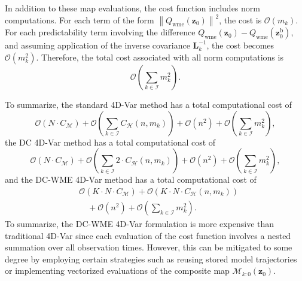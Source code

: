 \documentclass[final,1p,times]{elsarticle}
\begin{document}
In addition to these map evaluations, the cost function includes norm computations. 
For each term of the form $\left\| Q_{\mathrm{wme}}(\mathbf{z}_0) \right\|^2$, the cost is $\mathcal{O}(m_k)$. 
For each predictability term involving the difference $Q_{\mathrm{wme}}(\mathbf{z}_0) - Q_{\mathrm{wme}}(\mathbf{z}_0^{\mathrm{b}})$, and assuming application of the inverse covariance $\mathbf{L}_k^{-1}$, the cost becomes $\mathcal{O}(m_k^2)$. 
Therefore, the total cost associated with all norm computations is
\[
    \mathcal{O}\left( \sum_{k \in \mathcal{I}} m_k^2 \right).
\]

To summarize, the standard 4D-Var method has a total computational cost of
\begin{equation*}
    \mathcal{O}(N \cdot C_{\mathcal{M}}) + \mathcal{O}\left( \sum\limits_{k \in \mathcal{I}} C_{\mathcal{H}}(n, m_k) \right) + \mathcal{O}(n^2)+ \mathcal{O}\left( \sum\limits_{k \in \mathcal{I}} m_k^2 \right),
\end{equation*}
the DC 4D-Var method has a total computational cost of
\begin{equation*}
    \mathcal{O}(N \cdot C_{\mathcal{M}}) + \mathcal{O}\left( \sum\limits_{k \in \mathcal{I}} 2 \cdot C_{\mathcal{H}}(n, m_k) \right)   + \mathcal{O}(n^2) + \mathcal{O}\left( \sum\limits_{k \in \mathcal{I}} m_k^2 \right),
\end{equation*}
and the DC-WME 4D-Var method has a total computational cost of
\begin{equation*}
\begin{split}
    &\mathcal{O}(K \cdot N \cdot C_{\mathcal{M}}) 
     + \mathcal{O}(K \cdot N \cdot C_{\mathcal{H}}(n, m_k)) \\
    &\quad + \mathcal{O}(n^2) 
     + \mathcal{O}\!\left( \sum\limits_{k \in \mathcal{I}} m_k^2 \right).
\end{split}
\end{equation*}
To summarize, the DC-WME 4D-Var formulation is more expensive than traditional 4D-Var since each evaluation of the cost function involves a nested summation over all observation times. However, this can be mitigated to some degree by employing certain strategies such as reusing stored model trajectories or implementing vectorized evaluations of the composite map $ \mathcal{M}_{k:0}(\mathbf{z}_0) $.
\end{document}

